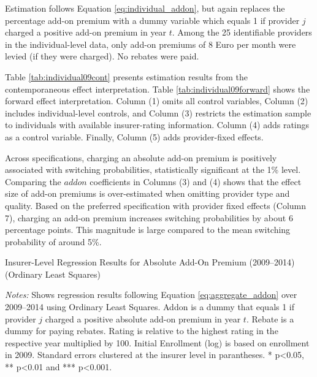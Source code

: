 \documentclass[a4paper, 11pt, english]{article}
\begin{document}
Estimation follows Equation \eqref{eq:individual_addon}, but again replaces the percentage add-on premium with a dummy variable which equals 1 if provider $j$ charged a positive add-on premium in year $t$. Among the 25 identifiable providers in the individual-level data, only add-on premiums of 8 Euro per month were levied (if they were charged). No rebates were paid.

Table \ref{tab:individual09cont} presents estimation results from the contemporaneous effect interpretation. Table \ref{tab:individual09forward} shows the forward effect interpretation. Column (1) omits all control variables, Column (2) includes individual-level controls, and Column (3) restricts the estimation sample to individuals with available insurer-rating information. Column (4) adds ratings as a control variable. Finally, Column (5) adds provider-fixed effects.

Across specifications, charging an absolute add-on premium is positively associated with switching probabilities, statistically significant at the 1\% level. Comparing the $addon$ coefficients in Columns (3) and (4) shows that the effect size of add-on premiums is over-estimated when omitting provider type and quality. Based on the preferred specification with provider fixed effects (Column 7), charging an add-on premium increases switching probabilities by about 6 percentage points. This magnitude is large compared to the mean switching probability of around 5\%. 

\begin{table}[ht]
	\captionsetup{justification=centering}
	\caption{Insurer-Level Regression Results for Absolute Add-On Premium (2009--2014) \\ (Ordinary Least Squares)}
	\label{tab:Aggregate09baseline}
	
	\begin{minipage}{\textwidth}
		\vspace{3pt}
		\small \textit{Notes:} Shows regression results following Equation \eqref{eq:aggregate_addon} over 2009--2014 using Ordinary Least Squares. 
		Addon is a dummy that equals 1 if provider $j$ charged a positive absolute add-on premium in year $t$. Rebate is a dummy for paying rebates. Rating is relative to the highest rating in the respective year multiplied by 100. Initial Enrollment (log) is based on enrollment in 2009.
		Standard errors clustered at the insurer level in parantheses. * p<0.05, **  p<0.01 and *** p<0.001. 
	\end{minipage}
\end{table}
\end{document}
